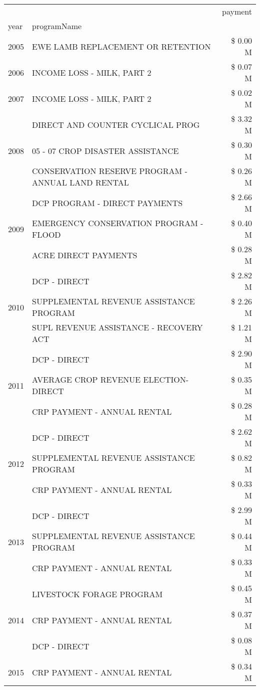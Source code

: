 \begin{tabular}{llr}
\toprule
 &  & payment \\
year & programName &  \\
\midrule
2005 & EWE LAMB REPLACEMENT OR RETENTION & \$ 0.00 M \\
\cline{1-3}
2006 & INCOME LOSS - MILK, PART 2 & \$ 0.07 M \\
\cline{1-3}
2007 & INCOME LOSS - MILK, PART 2 & \$ 0.02 M \\
\cline{1-3}
\multirow[t]{3}{*}{2008} & DIRECT AND COUNTER CYCLICAL PROG & \$ 3.32 M \\
 & 05 - 07 CROP DISASTER ASSISTANCE & \$ 0.30 M \\
 & CONSERVATION RESERVE PROGRAM - ANNUAL LAND RENTAL & \$ 0.26 M \\
\cline{1-3}
\multirow[t]{3}{*}{2009} & DCP PROGRAM - DIRECT PAYMENTS & \$ 2.66 M \\
 & EMERGENCY CONSERVATION PROGRAM - FLOOD & \$ 0.40 M \\
 & ACRE DIRECT PAYMENTS & \$ 0.28 M \\
\cline{1-3}
\multirow[t]{3}{*}{2010} & DCP - DIRECT & \$ 2.82 M \\
 & SUPPLEMENTAL REVENUE ASSISTANCE PROGRAM & \$ 2.26 M \\
 & SUPL REVENUE ASSISTANCE - RECOVERY ACT & \$ 1.21 M \\
\cline{1-3}
\multirow[t]{3}{*}{2011} & DCP - DIRECT & \$ 2.90 M \\
 & AVERAGE CROP REVENUE ELECTION-DIRECT & \$ 0.35 M \\
 & CRP PAYMENT - ANNUAL RENTAL & \$ 0.28 M \\
\cline{1-3}
\multirow[t]{3}{*}{2012} & DCP - DIRECT & \$ 2.62 M \\
 & SUPPLEMENTAL REVENUE ASSISTANCE PROGRAM & \$ 0.82 M \\
 & CRP PAYMENT - ANNUAL RENTAL & \$ 0.33 M \\
\cline{1-3}
\multirow[t]{3}{*}{2013} & DCP - DIRECT & \$ 2.99 M \\
 & SUPPLEMENTAL REVENUE ASSISTANCE PROGRAM & \$ 0.44 M \\
 & CRP PAYMENT - ANNUAL RENTAL & \$ 0.33 M \\
\cline{1-3}
\multirow[t]{3}{*}{2014} & LIVESTOCK FORAGE PROGRAM & \$ 0.45 M \\
 & CRP PAYMENT - ANNUAL RENTAL & \$ 0.37 M \\
 & DCP - DIRECT & \$ 0.08 M \\
\cline{1-3}
\multirow[t]{3}{*}{2015} & CRP PAYMENT - ANNUAL RENTAL & \$ 0.34 M \\

\end{tabular}

